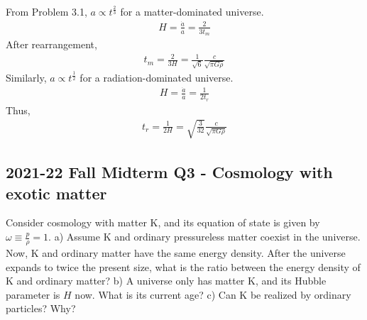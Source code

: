 \documentclass[12pt]{book} %
\numberwithin{equation}{chapter}
\def\w{\omega}
\begin{document}
\begin{solbox}
From Problem 3.1, $a\propto t^{\frac{2}{3}}$ for a matter-dominated universe.
\begin{align*}
H=\frac{\dot{a}}{a}=\frac{2}{3t_{m}}
\end{align*}
After rearrangement,
\begin{align*}
t_{m}=\frac{2}{3H}=\frac{1}{\sqrt{6}}\frac{c}{\sqrt{\pi G\rho}}
\end{align*}
Similarly, $a\propto t^{\frac{1}{2}}$ for a radiation-dominated universe.
\begin{align*}
H=\frac{\dot{a}}{a}=\frac{1}{2t_{r}}
\end{align*}
Thus,
\begin{align*}
t_{r}=\frac{1}{2H}=\sqrt{\frac{3}{32}}\frac{c}{\sqrt{\pi G\rho}}
\end{align*}
\end{solbox}

\subsection*{2021-22 Fall Midterm Q3 - Cosmology with exotic matter}
Consider cosmology with matter K, and its equation of state is given by $\w\equiv\frac{p}{\rho}=1$.\bigskip\newline
a) Assume K and ordinary pressureless matter coexist in the universe. Now, K and ordinary matter have the same energy density. After the universe expands to twice the present size, what is the ratio between the energy density of K and ordinary matter?\bigskip\newline
b) A universe only has matter K, and its Hubble parameter is $H$ now. What is its current age?\bigskip\newline
c) Can K be realized by ordinary particles? Why?
\end{document}
